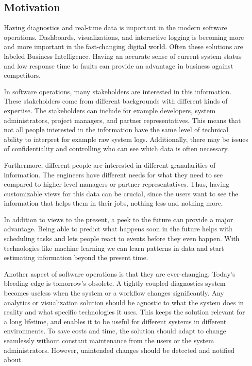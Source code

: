 \documentclass[english,12pt,a4paper,pdftex,sci,utf8]{aaltothesis}
\theoremstyle{definition}
\begin{document}
\subsection{Motivation}
Having diagnostics and real-time data is important in the modern software operations.
Dashboards, visualizations, and interactive logging is becoming more and more important
in the fast-changing digital world. Often these solutions are labeled Business Intelligence.
Having an accurate sense of current system status and low response time to faults can provide an advantage
in business against competitors.


In software operations, many stakeholders are interested in this information. 
These stakeholders come from different backgrounds with different kinds of expertise.
The stakeholders can include for example developers, system administrators, project managers, and partner representatives.
This means that not all people interested in the information have the same level of technical ability to 
interpret for example raw system logs. Additionally, there may be issues of confidentiality and
controlling who can see which data is often necessary.

Furthermore, different people are interested in different granularities of information.
The engineers have different needs for what they need to see compared to higher level managers
or partner representatives.
Thus, having customizable views for this data can be crucial,
since the users want to see the information that helps them in their jobs, nothing less and nothing more.

In addition to views to the present, a peek to the future can provide a major advantage.
Being able to predict what happens soon in the future helps with scheduling tasks and lets people react 
to events before they even happen. With technologies like machine learning we can learn patterns in data and 
start estimating information beyond the present time.

Another aspect of software operations is that they are ever-changing. 
Today's bleeding edge is tomorrow's obsolete. A tightly coupled diagnostics system
becomes useless when the system or a workflow changes significantly. Any analytics or visualization solution should
be agnostic to what the system does in reality and what specific technologies it uses. 
This keeps the solution relevant for a long lifetime, 
and enables it to be useful for different systems in different environments. 
To save costs and time, the solution should adapt to change seamlessly without constant maintenance from the users or the system administrators. However, unintended changes should be detected and notified about.
\end{document}
